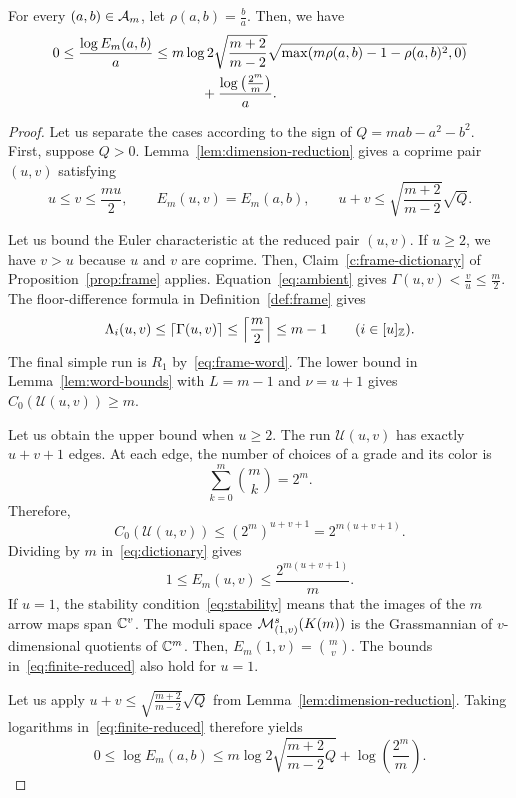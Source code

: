 \begin{proposition}\label{prop:finite-endpoint}
For every $(a,b)\in\mathcal A_m$, let $\rho(a,b)=\frac{b}{a}$.
Then, we have
\begin{equation}\label{eq:finite-endpoint}
\begin{split}
 0\le\frac{\log E_m(a,b)}a
 &\le m\log2\sqrt{\frac{m+2}{m-2}}
             \sqrt{\max(m\rho(a,b)-1-\rho(a,b)^2,0)}\\
 &\hspace{12mm}+\frac{\log\left(\frac{2^m}{m}\right)}a.
\end{split}
\end{equation}
\end{proposition}
\begin{proof}
Let us separate the cases according to the sign of $Q=mab-a^2-b^2$.
First, suppose $Q>0$.
Lemma~\ref{lem:dimension-reduction} gives a coprime pair $(u,v)$ satisfying
\[
 u\le v\le\frac{mu}{2},\qquad E_m(u,v)=E_m(a,b),\qquad
 u+v\le\sqrt{\frac{m+2}{m-2}}\sqrt Q.
\]

Let us bound the Euler characteristic at the reduced pair $(u,v)$.
If $u\ge2$, we have $v>u$ because $u$ and $v$ are coprime. Then, Claim~\ref{c:frame-dictionary} of Proposition~\ref{prop:frame} applies.
Equation~\eqref{eq:ambient} gives $\Gamma(u,v)<\frac vu\le\frac m2$.
The floor-difference formula in Definition~\ref{def:frame} gives
\[
 \Lambda_i(u,v)\le\left\lceil\Gamma(u,v)\right\rceil\le\left\lceil\frac m2\right\rceil\le m-1
 \qquad(i\in[u]_{\mathbb Z}).
\]
The final simple run is $R_1$ by~\eqref{eq:frame-word}.
The lower bound in Lemma~\ref{lem:word-bounds}
with $L=m-1$ and $\nu=u+1$ gives $C_0(\mathcal U(u,v))\ge m$.

Let us obtain the upper bound when $u\ge2$.
The run $\mathcal U(u,v)$ has exactly $u+v+1$ edges.
At each edge, the number of choices of a grade and its color is
\[
 \sum_{k=0}^m\binom{m}{k}=2^m.
\]
Therefore,
\[
 C_0(\mathcal U(u,v))\le(2^m)^{u+v+1}=2^{m(u+v+1)}.
\]
Dividing by $m$ in~\eqref{eq:dictionary} gives
\begin{equation}\label{eq:finite-reduced}
 1\le E_m(u,v)\le\frac{2^{m(u+v+1)}}m.
\end{equation}
If $u=1$, the stability condition~\eqref{eq:stability} means that the images of the $m$ arrow maps span $\mathbb C^v$.
The moduli space $\mathcal M^s_{(1,v)}(K(m))$ is the Grassmannian of $v$-dimensional quotients of
$\mathbb C^m$. Then, $E_m(1,v)=\binom mv$. The bounds in~\eqref{eq:finite-reduced} also hold for $u=1$.

Let us apply $u+v\le\sqrt{\frac{m+2}{m-2}}\sqrt Q$ from Lemma~\ref{lem:dimension-reduction}.
Taking logarithms in~\eqref{eq:finite-reduced} therefore yields
\begin{equation}\label{eq:finite-Q}
 0\le\log E_m(a,b)
 \le m\log2\sqrt{\frac{m+2}{m-2}Q}+\log\left(\frac{2^m}{m}\right).
\end{equation}


\end{proof}
